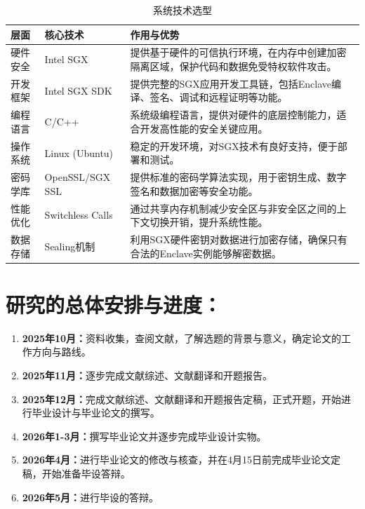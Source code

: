 \documentclass{article}
\begin{document}
\begin{table}[htbp]
\centering
\caption{系统技术选型}
\begin{tabular}{|p{2cm}|p{3cm}|p{9cm}|}
\hline
\textbf{层面} & \textbf{核心技术} & \textbf{作用与优势} \\
\hline
硬件安全 & Intel SGX & 提供基于硬件的可信执行环境，在内存中创建加密隔离区域，保护代码和数据免受特权软件攻击。 \\
\hline
开发框架 & Intel SGX SDK & 提供完整的SGX应用开发工具链，包括Enclave编译、签名、调试和远程证明等功能。 \\
\hline
编程语言 & C/C++ & 系统级编程语言，提供对硬件的底层控制能力，适合开发高性能的安全关键应用。 \\
\hline
操作系统 & Linux (Ubuntu) & 稳定的开发环境，对SGX技术有良好支持，便于部署和测试。 \\
\hline
密码学库 & OpenSSL/SGX SSL & 提供标准的密码学算法实现，用于密钥生成、数字签名和数据加密等安全功能。 \\
\hline
性能优化 & Switchless Calls & 通过共享内存机制减少安全区与非安全区之间的上下文切换开销，提升系统性能。 \\
\hline
数据存储 & Sealing机制 & 利用SGX硬件密钥对数据进行加密存储，确保只有合法的Enclave实例能够解密数据。 \\
\hline
\end{tabular}
\end{table}

\newpage
\vspace{0.8cm}
\fullwidthrule
\section{研究的总体安排与进度：}

\begin{enumerate}[leftmargin=*, label=\arabic*、]
  \item \textbf{2025年10月：}资料收集，查阅文献，了解选题的背景与意义，确定论文的工作方向与路线。
  
  \item \textbf{2025年11月：}逐步完成文献综述、文献翻译和开题报告。
  
  \item \textbf{2025年12月：}完成文献综述、文献翻译和开题报告定稿，正式开题，开始进行毕业设计与毕业论文的撰写。
  
  \item \textbf{2026年1-3月：}撰写毕业论文并逐步完成毕业设计实物。
  
  \item \textbf{2026年4月：}进行毕业论文的修改与核查，并在4月15日前完成毕业论文定稿，开始准备毕设答辩。
  
  \item \textbf{2026年5月：}进行毕设的答辩。
\end{enumerate}
\end{document}
